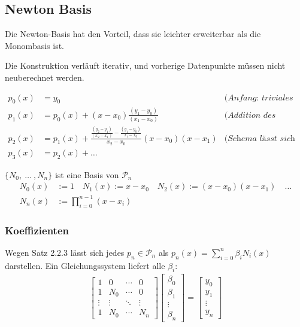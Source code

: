\newpage
\subsection{Newton Basis}

Die Newton-Basis hat den Vorteil, dass sie leichter erweiterbar als die Monombasis ist.

Die Konstruktion verläuft iterativ, und vorherige Datenpunkte müssen nicht neuberechnet werden.

\begin{align*}
    p_0(x) &= y_0 &\textit{(Anfang: triviales Polynom)} \\
    p_1(x) &= p_0(x) + (x-x_0)\frac{(y_1-y_0)}{(x_1-x_0)} & \textit{(Addition des zweiten Datenpunktes)} \\
    p_2(x) &= p_1(x) + \frac{\frac{(y_2-y_1)}{(x_2-x_1)}-\frac{(y_1-y_0)}{x_1-x_0}}{x_2-x_0} (x-x_0)(x-x_1) & \textit{(Schema lässt sich beliebig weiterführen)}\\
    p_3(x) &= p_2(x) + \ldots
\end{align*}

\setcounter{all}{3}
 $\{ N_0,\ \ldots\ ,N_n\}$ ist eine Basis von $\mathcal{P}_n$
\begin{align*}
    N_0(x) &:= 1 \quad
    N_1(x) := x - x_0 \quad
    N_2(x) := (x-x_0)(x-x_1) \quad \ldots \\
    N_n(x) &:= \prod_{i=0}^{n-1} (x-x_i)
\end{align*}

\subsubsection{Koeffizienten}

Wegen Satz 2.2.3 lässt sich jedes $p_n \in \mathcal{P}_n$ als $p_n(x) =\displaystyle\sum_{i=0}^{n} \beta_i N_i(x)$ darstellen. Ein Gleichungssystem liefert alle $\beta_i$:
\begin{align*}
    \begin{bmatrix}
        1 & 0   & \cdots & 0 \\
        1 & N_0 & \cdots & 0 \\
        \vdots & \vdots & \ddots & \vdots \\
        1 & N_0 & \cdots & N_n
    \end{bmatrix}
    \begin{bmatrix}
        \beta_0 \\
        \beta_1 \\
        \vdots \\
        \beta_n
    \end{bmatrix}
    =
    \begin{bmatrix}
        y_0 \\
        y_1 \\
        \vdots \\
        y_n
    \end{bmatrix}
\end{align*}


